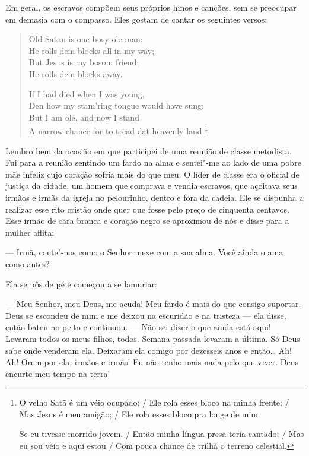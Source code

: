 Em geral, os escravos compõem seus
próprios hinos e canções, sem se preocupar em demasia com o compasso.
Eles gostam de cantar os seguintes versos:

\begin{verse}
Old Satan is one busy ole man;\\
He rolls dem blocks all in my way;\\
But Jesus is my bosom friend;\\
He rolls dem blocks away.

If I had died when I was young,\\
Den how my stam'ring tongue would have \qb sung;\\
But I am ole, and now I stand\\
A narrow chance for to tread dat heavenly \qb land.\footnote{O velho Satã é um
véio ocupado; / Ele rola esses bloco na minha frente; / Mas Jesus é meu
amigão; / Ele rola esses bloco pra longe de mim.

Se eu tivesse morrido jovem, / Então minha língua presa
teria cantado; / Mas eu sou véio e aqui estou / Com pouca chance de
trilhá o terreno celestial.}
\end{verse}

Lembro bem da ocasião em que participei
de uma reunião de classe metodista. Fui para a reunião sentindo um fardo
na alma e sentei"-me ao lado de uma pobre mãe infeliz cujo coração sofria
mais do que meu. O líder de classe era o oficial de justiça da cidade,
um homem que comprava e vendia escravos, que açoitava seus irmãos e
irmãs da igreja no pelourinho, dentro e fora da cadeia. Ele se dispunha
a realizar esse rito cristão onde quer que fosse pelo preço de cinquenta
centavos. Esse irmão de cara branca e coração negro se aproximou de nós
e disse para a mulher aflita:

--- Irmã, conte"-nos como o Senhor mexe com a sua alma. Você ainda o ama
como antes?

Ela se pôs de pé e começou a se
lamuriar:

--- Meu Senhor, meu Deus, me acuda! Meu fardo é mais do que consigo
suportar. Deus se escondeu de mim e me deixou na escuridão e na tristeza
--- ela disse, então bateu no peito e continuou. --- Não sei dizer o que
ainda está aqui! Levaram todos os meus filhos, todos. Semana passada
levaram a última. Só Deus sabe onde venderam ela. Deixaram ela comigo
por dezesseis anos e então\ldots{} Ah! Ah! Orem por ela, irmãos e irmãs!
Eu não tenho mais nada pelo que viver. Deus encurte meu tempo na terra!

